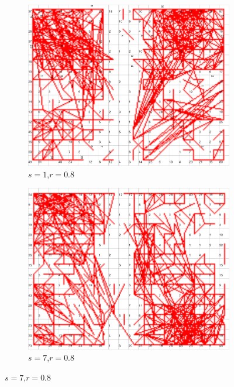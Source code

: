 \documentclass{acm_proc_article-sp}
\begin{document}
\begin{figure}
\centering
    \centering
    \begin{subfigure}[b]{0.30\linewidth}
        \includegraphics[width=\linewidth]{img/wine-newmid-radius-neighbourhood-graph--r-08-seed-1}
        \caption{$s=1$,$r=0.8$}
        \label{fig:wine-newmid-radius-neighbourhood-graph--r-08-seed-1}
    \end{subfigure}
    \begin{subfigure}[b]{0.30\linewidth}
        \includegraphics[width=\linewidth]{img/wine-newmid-radius-neighbourhood-graph--r-08-seed-7}
        \caption{$s=7$,$r=0.8$}

\end{subfigure}
\end{figure}
\end{document}
